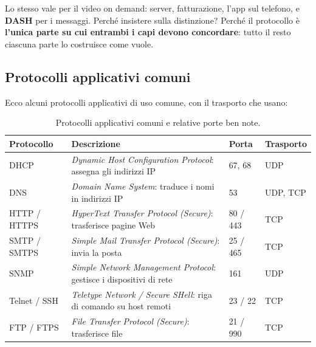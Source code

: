 Lo stesso vale per il video on demand: server, fatturazione, l'app sul telefono, e \textbf{DASH} per i messaggi.
Perché insistere sulla distinzione? Perché il protocollo è \textbf{l'unica parte su cui entrambi i capi devono
concordare}: tutto il resto ciascuna parte lo costruisce come vuole.

\subsection{Protocolli applicativi comuni}

Ecco alcuni protocolli applicativi di uso comune, con il trasporto che usano:

\begin{table}[H]
\centering
\begin{tabular}{lp{8.6cm}ll}
\toprule
\textbf{Protocollo} & \textbf{Descrizione} & \textbf{Porta} & \textbf{Trasporto} \\
\midrule
DHCP & \emph{Dynamic Host Configuration Protocol}: assegna gli indirizzi IP & 67, 68 & UDP \\
DNS & \emph{Domain Name System}: traduce i nomi in indirizzi IP & 53 & UDP, TCP \\
HTTP / HTTPS & \emph{HyperText Transfer Protocol (Secure)}: trasferisce pagine Web & 80 / 443 & TCP \\
SMTP / SMTPS & \emph{Simple Mail Transfer Protocol (Secure)}: invia la posta & 25 / 465 & TCP \\
SNMP & \emph{Simple Network Management Protocol}: gestisce i dispositivi di rete & 161 & UDP \\
Telnet / SSH & \emph{Teletype Network / Secure SHell}: riga di comando su host remoti & 23 / 22 & TCP \\
FTP / FTPS & \emph{File Transfer Protocol (Secure)}: trasferisce file & 21 / 990 & TCP \\
\bottomrule
\end{tabular}
\caption{Protocolli applicativi comuni e relative porte ben note.}
\end{table}


